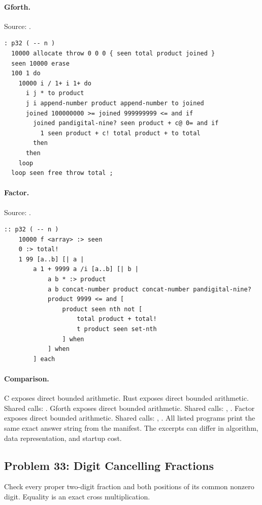\paragraph{Gforth.} Source: .
\begin{lstlisting}
: p32 ( -- n )
  10000 allocate throw 0 0 0 { seen total product joined }
  seen 10000 erase
  100 1 do
    10000 i / 1+ i 1+ do
      i j * to product
      j i append-number product append-number to joined
      joined 100000000 >= joined 999999999 <= and if
        joined pandigital-nine? seen product + c@ 0= and if
          1 seen product + c! total product + to total
        then
      then
    loop
  loop seen free throw total ;
\end{lstlisting}

\paragraph{Factor.} Source: .
\begin{lstlisting}
:: p32 ( -- n )
    10000 f <array> :> seen
    0 :> total!
    1 99 [a..b] [| a |
        a 1 + 9999 a /i [a..b] [| b |
            a b * :> product
            a b concat-number product concat-number pandigital-nine?
            product 9999 <= and [
                product seen nth not [
                    total product + total!
                    t product seen set-nth
                ] when
            ] when
        ] each
\end{lstlisting}

\paragraph{Comparison.}
C exposes direct bounded arithmetic. Rust exposes direct bounded arithmetic. Shared calls: \texttt{}. Gforth exposes direct bounded arithmetic. Shared calls: \texttt{}, \texttt{}. Factor exposes direct bounded arithmetic. Shared calls: \texttt{}, \texttt{}.
All listed programs print the same exact answer string from the manifest. The excerpts can differ in algorithm, data representation, and startup cost.

\subsection{Problem 33: Digit Cancelling Fractions}
\label{walkthrough:p33}
Check every proper two-digit fraction and both positions of its common nonzero digit. Equality is an exact cross multiplication.

